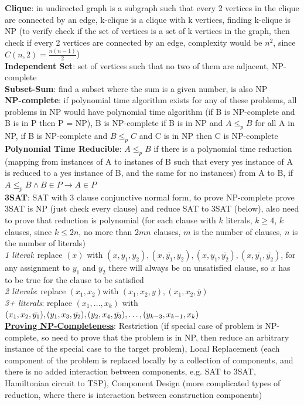 \documentclass[a4paper]{article}
\begin{document}
\begin{multicols}{2}
        \textbf{Clique}: in undirected graph is a subgraph such that every 2 vertices in the clique are connected by an edge, k-clique is a clique with k vertices, finding k-clique is NP (to verify check if the set of vertices is a set of k vertices in the graph, then check if every 2 vertices are connected by an edge, complexity would be $n^2$, since $C(n, 2) = \frac{n(n-1)}{2}$)\\
        \textbf{Independent Set}: set of vertices such that no two of them are adjacent, NP-complete\\
        \textbf{Subset-Sum}: find a subset where the sum is a given number, is also NP\\
        \textbf{NP-complete}: if polynomial time algorithm exists for any of these problems, all problems in NP would have polynomial time algorithm (if B is NP-complete and B is in P then P = NP), B is NP-complete if B is in NP and $A \leq_p B$ for all A in NP, if B is NP-complete and $B \leq_p C$ and C is in NP then C is NP-complete\\
        \textbf{Polynomial Time Reducible}: $A \leq_p B$ if there is a polynomial time reduction (mapping from instances of A to instanes of B such that every yes instance of A is reduced to a yes instance of B, and the same for no instances) from A to B, if $A \leq_p B \wedge B \in P \to A \in P$\\
        \textbf{3SAT}: SAT with 3 clause conjunctive normal form, to prove NP-complete prove 3SAT is NP (just check every clause) and reduce SAT to 3SAT (below), also need to prove that reduction is polynomial (for each clause with $k$ literals, $k \geq 4$, $k$ clauses, since $k \leq 2n$, no more than $2mn$ clauses, $m$ is the number of clauses, $n$ is the number of literals)\\
        \textit{1 literal}: replace $(x)$ with $(x, y_1, y_2), (x, \bar{y_1}, y_2), (x, y_1, \bar{y_2}), (x, \bar{y_1}, \bar{y_2})$, for any assignment to $y_1$ and $y_2$ there will always be on unsatisfied clause, so $x$ has to be true for the clause to be satisfied\\
        \textit{2 literals}: replace $(x_1, x_2) $with $(x_1, x_2, y), (x_1, x_2, \bar{y})$\\
        \textit{3+ literals}: replace $(x_1, \ldots, x_k)$ with $(x_1, x_2, \bar{y_1}), (y_1, x_3, \bar{y_2}), (y_2, x_4, \bar{y_3}), \ldots, \\(y_{k-3}, x_{k-1}, x_k)$\\
        \underline{\textbf{Proving NP-Completeness}}: Restriction (if special case of problem is NP-complete, so need to prove that the problem is in NP, then reduce an arbitrary instance of the special case to the target problem), Local Replacement (each component of the problem is replaced locally by a collection of components, and there is no added interaction between components, e.g. SAT to 3SAT, Hamiltonian circuit to TSP), Component Design (more complicated types of reduction, where there is interaction between construction components)\\

\end{multicols}
\end{document}
